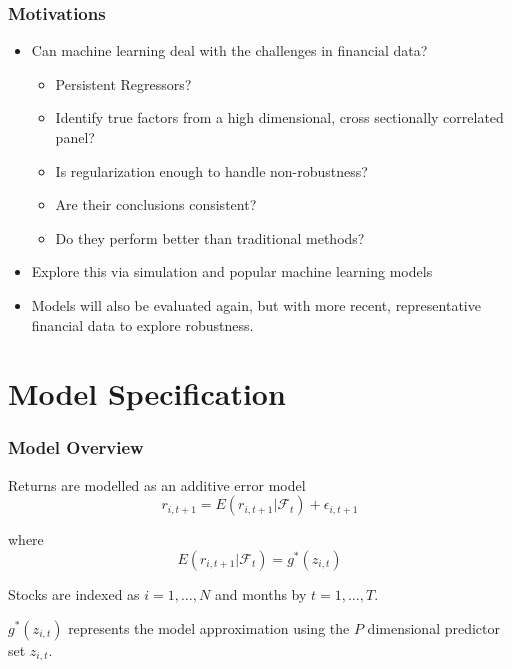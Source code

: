 \documentclass[]{beamer}
\begin{document}
\begin{frame}
\frametitle{Motivations}
\begin{itemize}
\item Can machine learning deal with the challenges in financial data?
\begin{itemize}
	\item Persistent Regressors?
	\item Identify true factors from a high dimensional, cross sectionally correlated panel?
	\item Is regularization enough to handle non-robustness?
	\item Are their conclusions consistent?
	\item Do they perform better than traditional methods?
\end{itemize}

\item Explore this via simulation and popular machine learning models
\item Models will also be evaluated again, but with more recent, representative financial data to explore robustness. 
\end{itemize}
\end{frame}

\section{Model Specification}

\begin{frame}
\frametitle{Model Overview}
Returns are modelled as an additive error model
\begin{equation}
	r_{i, t+1} = E(r_{i, t+1} | \mathcal{F}_t) + \epsilon_{i, t+1}
\end{equation}
		
where 
\begin{equation}
	E(r_{i, t+1} | \mathcal{F}_t) = g^*(z_{i,t})
\end{equation}
		
Stocks are indexed as $i = 1, \dots, N$ and months by $t = 1, \dots, T$. 

$g^*(z_{i,t})$ represents the model approximation using the $P$ dimensional predictor set $z_{i,t}$. 
\end{frame}

\end{document}

